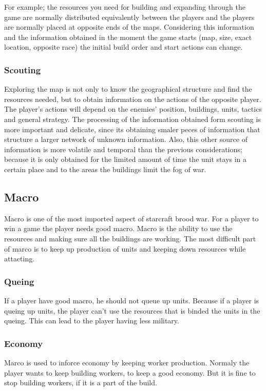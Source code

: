 				For example; the resources you need for building and expanding through the game are normally distributed
				equivalently between the players and the players are normally placed at opposite ends of the maps. 
				Considering this information and the information obtained in the moment the game starts 
				(map, size, exact location, opposite race) the initial build order and start actions can change. 
		
			\subsubsection{Scouting}
				Exploring the map is not only to know the geographical structure and find the resources needed, 
				but to obtain information on the actions of the opposite player. The player's actions will depend on
				the enemies' position, buildings, units, tactics and general strategy. The processing of the information 
				obtained form scouting is more important and delicate, since its obtaining smaler peces of information 
				that structure a larger network of unknown information. Also, this other source of information 
				is more volatile and temporal than the previous considerations; because it is only obtained for the 
				limited amount of time the unit stays in a certain place and to the areas the buildings limit the fog of war. 
	\subsection{Macro}
		Macro is one of the most imported aspect of starcraft brood war. For a player to win a game the player needs good macro. 
		Macro is the ability to use the resources and making sure all the buildings are working. 
		The most difficult part of marco is to keep up production of units and keeping down resources while attacting.  
			
			\subsubsection{Queing}
				If a player have good macro, he should not queue up units. 
				Because if a player is queing up units, the player can't use the resources that is binded the units in the queing. 
				This can lead to the player having less military.
	
			\subsubsection{Economy}
				Marco is used to inforce economy by keeping worker production. Normaly the player wants to keep building workers, to keep a good economy.
				But it is fine to stop building workers, if it is a part of the build.
				
